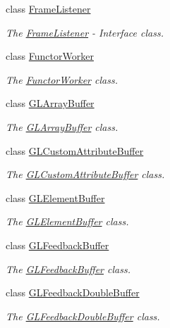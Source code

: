 \begin{DoxyCompactItemize}
class \hyperlink{classEngine_1_1FrameListener}{Frame\+Listener}
\begin{DoxyCompactList}\small\item\em The \hyperlink{classEngine_1_1FrameListener}{Frame\+Listener} -\/ Interface class. \end{DoxyCompactList}\item 
class \hyperlink{classEngine_1_1FunctorWorker}{Functor\+Worker}
\begin{DoxyCompactList}\small\item\em The \hyperlink{classEngine_1_1FunctorWorker}{Functor\+Worker} class. \end{DoxyCompactList}\item 
class \hyperlink{classEngine_1_1GLArrayBuffer}{G\+L\+Array\+Buffer}
\begin{DoxyCompactList}\small\item\em The \hyperlink{classEngine_1_1GLArrayBuffer}{G\+L\+Array\+Buffer} class. \end{DoxyCompactList}\item 
class \hyperlink{classEngine_1_1GLCustomAttributeBuffer}{G\+L\+Custom\+Attribute\+Buffer}
\begin{DoxyCompactList}\small\item\em The \hyperlink{classEngine_1_1GLCustomAttributeBuffer}{G\+L\+Custom\+Attribute\+Buffer} class. \end{DoxyCompactList}\item 
class \hyperlink{classEngine_1_1GLElementBuffer}{G\+L\+Element\+Buffer}
\begin{DoxyCompactList}\small\item\em The \hyperlink{classEngine_1_1GLElementBuffer}{G\+L\+Element\+Buffer} class. \end{DoxyCompactList}\item 
class \hyperlink{classEngine_1_1GLFeedbackBuffer}{G\+L\+Feedback\+Buffer}
\begin{DoxyCompactList}\small\item\em The \hyperlink{classEngine_1_1GLFeedbackBuffer}{G\+L\+Feedback\+Buffer} class. \end{DoxyCompactList}\item 
class \hyperlink{classEngine_1_1GLFeedbackDoubleBuffer}{G\+L\+Feedback\+Double\+Buffer}
\begin{DoxyCompactList}\small\item\em The \hyperlink{classEngine_1_1GLFeedbackDoubleBuffer}{G\+L\+Feedback\+Double\+Buffer} class. \end{DoxyCompactList}\item 

\end{DoxyCompactItemize}
